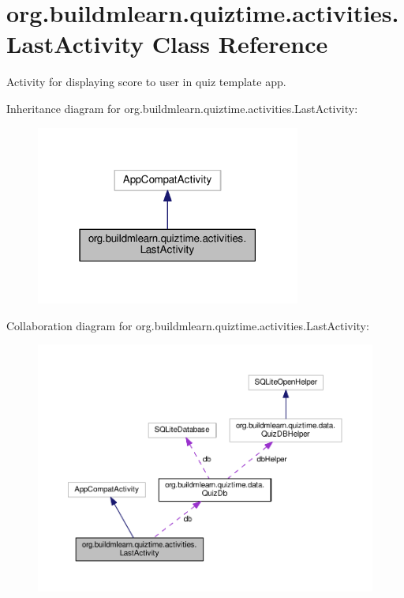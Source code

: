 \hypertarget{classorg_1_1buildmlearn_1_1quiztime_1_1activities_1_1LastActivity}{}\section{org.\+buildmlearn.\+quiztime.\+activities.\+Last\+Activity Class Reference}
\label{classorg_1_1buildmlearn_1_1quiztime_1_1activities_1_1LastActivity}


Activity for displaying score to user in quiz template app.  




Inheritance diagram for org.\+buildmlearn.\+quiztime.\+activities.\+Last\+Activity\+:
\nopagebreak
\begin{figure}[H]
\begin{center}
\leavevmode
\includegraphics[width=247pt]{classorg_1_1buildmlearn_1_1quiztime_1_1activities_1_1LastActivity__inherit__graph}
\end{center}
\end{figure}


Collaboration diagram for org.\+buildmlearn.\+quiztime.\+activities.\+Last\+Activity\+:
\nopagebreak
\begin{figure}[H]
\begin{center}
\leavevmode
\includegraphics[width=350pt]{classorg_1_1buildmlearn_1_1quiztime_1_1activities_1_1LastActivity__coll__graph}
\end{center}
\end{figure}

